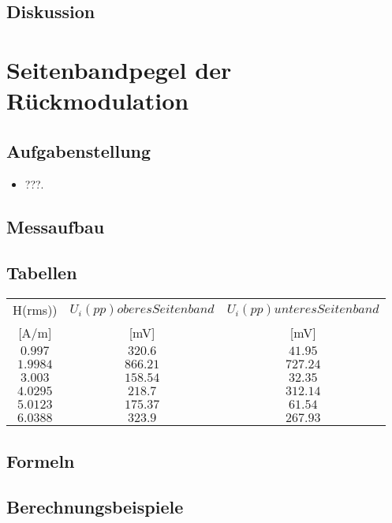 \documentclass[12pt,a4paper,ngerman]{article}
\begin{document}
\subsection{Diskussion}

\section{Seitenbandpegel der Rückmodulation}
\subsection{Aufgabenstellung}

\begin{itemize}
\item???.
\end{itemize}


\subsection{Messaufbau}

\subsection{Tabellen}
\begin{tabular}{ |c|c|c| }
  \hline

    H(rms)) & $U_i(pp) oberes Seitenband$ & $U_i(pp) unteres Seitenband$\\

	[A/m] & [mV] & [mV] \\
  \hline
  $0.997$ & $320.6$ & $41.95$\\
  \hline
  $1.9984$ & $866.21$ & $727.24$ \\
  \hline
  $3.003$ & $158.54$ & $32.35$\\
  \hline
  $4.0295$ & $218.7$ & $312.14$\\
    \hline
  $5.0123$ & $175.37$ & $61.54$\\
    \hline
  $6.0388$ & $323.9$ & $267.93$ \\
    \hline
  \hline
 
\end{tabular} 
\subsection{Formeln}

\subsection{Berechnungsbeispiele}
\end{document}
